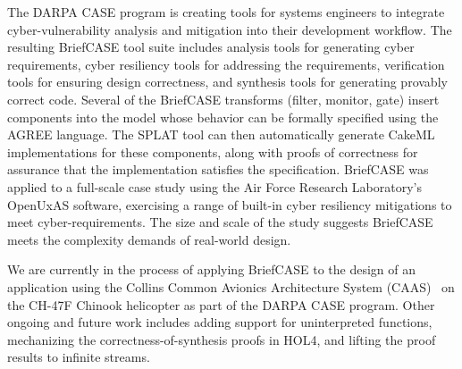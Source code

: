 The DARPA CASE program is creating tools for systems engineers to
integrate cyber-vulnerability analysis and mitigation into their
development workflow. The resulting BriefCASE tool suite includes
analysis tools for generating cyber requirements, cyber resiliency
tools for addressing the requirements, verification tools for ensuring
design correctness, and synthesis tools for generating provably
correct code. Several of the BriefCASE transforms (filter, monitor,
gate) insert components into the model whose behavior can be formally
specified using the AGREE language.  The SPLAT tool can then
automatically generate CakeML implementations for these components,
along with proofs of correctness for assurance that the implementation
satisfies the specification.
%
BriefCASE was applied to a full-scale case study using the Air Force
Research Laboratory's OpenUxAS software, exercising a range of
built-in cyber resiliency mitigations to meet cyber-requirements.  The
size and scale of the study suggests BriefCASE meets the complexity
demands of real-world design.

We are currently in the process of applying BriefCASE to the design of
an application using the Collins Common Avionics Architecture System
(CAAS)~\cite{caas} on the CH-47F Chinook helicopter as part of the
DARPA CASE program.  Other ongoing and future work includes
adding support for uninterpreted functions, mechanizing the
correctness-of-synthesis proofs in HOL4, and lifting the proof results
to infinite streams.
